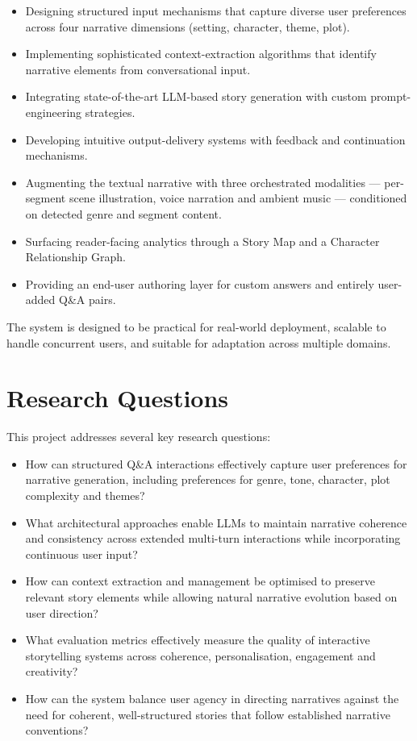\begin{itemize}
    \item Designing structured input mechanisms that capture diverse
    user preferences across four narrative dimensions (setting,
    character, theme, plot).
    \item Implementing sophisticated context-extraction algorithms
    that identify narrative elements from conversational input.
    \item Integrating state-of-the-art LLM-based story generation
    with custom prompt-engineering strategies.
    \item Developing intuitive output-delivery systems with feedback
    and continuation mechanisms.
    \item Augmenting the textual narrative with three orchestrated
    modalities --- per-segment scene illustration, voice narration
    and ambient music --- conditioned on detected genre and
    segment content.
    \item Surfacing reader-facing analytics through a Story Map and
    a Character Relationship Graph.
    \item Providing an end-user authoring layer for custom answers
    and entirely user-added Q\&A pairs.
\end{itemize}

The system is designed to be practical for real-world deployment,
scalable to handle concurrent users, and suitable for adaptation
across multiple domains.

\section{Research Questions}
This project addresses several key research questions:
\begin{itemize}
    \item How can structured Q\&A interactions effectively capture
    user preferences for narrative generation, including preferences
    for genre, tone, character, plot complexity and themes?
    \item What architectural approaches enable LLMs to maintain
    narrative coherence and consistency across extended multi-turn
    interactions while incorporating continuous user input?
    \item How can context extraction and management be optimised to
    preserve relevant story elements while allowing natural narrative
    evolution based on user direction?
    \item What evaluation metrics effectively measure the quality of
    interactive storytelling systems across coherence,
    personalisation, engagement and creativity?
    \item How can the system balance user agency in directing
    narratives against the need for coherent, well-structured stories
    that follow established narrative conventions?
\end{itemize}


